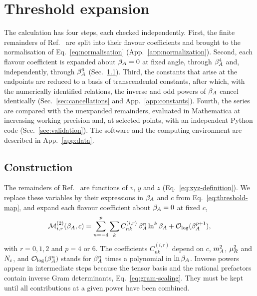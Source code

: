 \section{Threshold expansion}
\label{sec:expansion}

The calculation has four steps, each checked independently. First, the finite remainders of Ref.~\cite{Bhattacharya:2019bmd} are split into their flavour coefficients and brought to the normalisation of Eq.~\eqref{eq:normalisation} (App.~\ref{app:normalization}). Second, each flavour coefficient is expanded about $\beta_A=0$ at fixed angle, through $\beta_A^4$ and, independently, through $\beta_A^6$ (Sec.~\ref{sec:construction}). Third, the constants that arise at the endpoints are reduced to a basis of \BasisCountWord{} transcendental constants, after which, with the numerically identified relations, the inverse and odd powers of $\beta_A$ cancel identically (Sec.~\ref{sec:cancellations} and App.~\ref{app:constants}). Fourth, the series are compared with the unexpanded remainders, evaluated in Mathematica at increasing working precision and, at selected points, with an independent Python code (Sec.~\ref{sec:validation}).  The software and the computing environment are described in App.~\ref{app:data}.

\subsection{Construction}
\label{sec:construction}

The remainders of Ref.~\cite{Bhattacharya:2019bmd} are functions of $v$, $y$ and $z$ (Eq.~\eqref{eq:xyz-definition}). We replace these variables by their expressions in $\beta_A$ and $c$ from Eq.~\eqref{eq:threshold-map}, and expand each flavour coefficient about $\beta_A=0$ at fixed $c$,
\begin{equation}
 \mathcal{M}^{(2)}_{i,r}(\beta_A,c)
 =\sum_{n=-4}^{p}\sum_k
 C^{(i,r)}_{nk}\,\beta_A^n\ln^k\beta_A
 +\mathcal O_{\log}(\beta_A^{p+1}),
 \label{eq:series-structure}
\end{equation}
with $r=0,1,2$ and $p=4$ or 6. The coefficients $C^{(i,r)}_{nk}$ depend on $c$, $m_A^2$, $\mu_R^2$ and $N_c$, and $\mathcal O_{\log}(\beta_A^n)$ stands for $\beta_A^n$ times a polynomial in $\ln\beta_A$. Inverse powers appear in intermediate steps because the tensor basis and the rational prefactors contain inverse Gram determinants, Eq.~\eqref{eq:gram-scaling}. They must be kept until all contributions at a given power have been combined.

